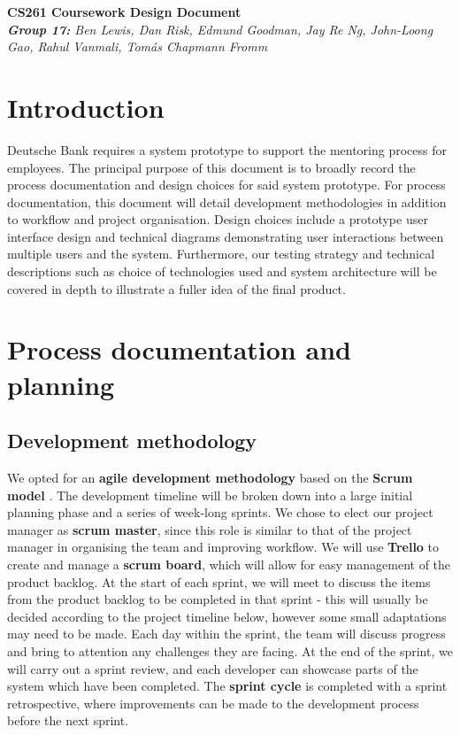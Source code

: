 \documentclass[10pt]{article}
\begin{document}
\begin{center}
    \Huge\textbf{CS261 Coursework Design Document}\\
    \vspace{2mm}
    \large{\textit{\textbf{Group 17:} Ben Lewis, Dan Risk, Edmund Goodman,
    Jay Re Ng, John-Loong Gao, Rahul Vanmali, Tomás Chapmann Fromm}}
\end{center}


\section{Introduction}
Deutsche Bank requires a system prototype to support the mentoring process for
employees. The principal purpose of this document is to broadly record the
process documentation and design choices for said system prototype. For process
documentation, this document will detail development methodologies in addition
to workflow and project organisation. Design choices include a prototype user
interface design and technical diagrams demonstrating user interactions between
multiple users and the system. Furthermore, our testing strategy and technical
descriptions such as choice of technologies used and system architecture will be
covered in depth to illustrate a fuller idea of the final product.

\section{Process documentation and planning}
\subsection{Development methodology}
We opted for an \textbf{agile development methodology} based on the
\textbf{Scrum model} \cite{scrum}. The development timeline will be broken down
into a large initial planning phase and a series of week-long sprints. We chose
to elect our project manager as \textbf{scrum master}, since this role is
similar to that of the project manager in organising the team and improving
workflow. We will use \textbf{Trello} \cite{trello} to create and manage a
\textbf{scrum board}, which will allow for easy management of the product
backlog. At the start of each sprint, we will meet to discuss the items
from the product backlog to be completed in that sprint - this will usually be
decided according to the project timeline below, however some small adaptations
may need to be made. Each day within the sprint, the team will discuss progress
and bring to attention any challenges they are facing. At the end of the sprint,
we will carry out a sprint review, and each developer can showcase parts of the
system which have been completed. The \textbf{sprint cycle} is completed with a
sprint retrospective, where improvements can be made to the development process
before the next sprint.
\end{document}
